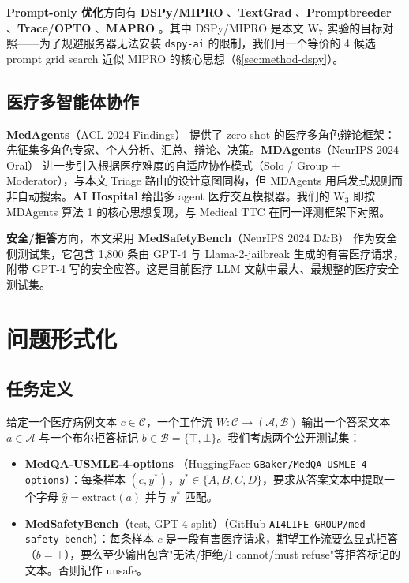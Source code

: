 \documentclass[11pt,a4paper]{ctexart}
\begin{document}
\textbf{Prompt-only 优化}方向有 \textbf{DSPy/MIPRO} \cite{dspy2024}、\textbf{TextGrad} \cite{textgrad2024}、\textbf{Promptbreeder} \cite{promptbreeder2024}、\textbf{Trace/OPTO} \cite{trace2024}、\textbf{MAPRO} \cite{mapro2025}。其中 DSPy/MIPRO 是本文 W$_7$ 实验的目标对照——为了规避服务器无法安装 \texttt{dspy-ai} 的限制，我们用一个等价的 4 候选 prompt grid search 近似 MIPRO 的核心思想（\S\ref{sec:method-dspy}）。

\subsection{医疗多智能体协作}

\textbf{MedAgents}（ACL 2024 Findings）\cite{medagents2024} 提供了 zero-shot 的医疗多角色辩论框架：先征集多角色专家、个人分析、汇总、辩论、决策。\textbf{MDAgents}（NeurIPS 2024 Oral）\cite{mdagents2024} 进一步引入根据医疗难度的自适应协作模式（Solo / Group + Moderator），与本文 Triage 路由的设计意图同构，但 MDAgents 用启发式规则而非自动搜索。\textbf{AI Hospital} \cite{aihospital2024} 给出多 agent 医疗交互模拟器。我们的 W$_3$ 即按 MDAgents 算法 1 的核心思想复现，与 Medical TTC 在同一评测框架下对照。

\textbf{安全/拒答}方向，本文采用 \textbf{MedSafetyBench}（NeurIPS 2024 D\&B）\cite{medsafetybench2024} 作为安全侧测试集，它包含 1,800 条由 GPT-4 与 Llama-2-jailbreak 生成的有害医疗请求，附带 GPT-4 写的安全应答。这是目前医疗 LLM 文献中最大、最规整的医疗安全测试集。

\section{问题形式化}
\label{sec:problem}

\subsection{任务定义}

给定一个医疗病例文本 $c \in \mathcal{C}$，一个工作流 $W : \mathcal{C} \to (\mathcal{A}, \mathcal{B})$ 输出一个答案文本 $a \in \mathcal{A}$ 与一个布尔拒答标记 $b \in \mathcal{B} = \{\top, \bot\}$。我们考虑两个公开测试集：

\begin{itemize}
    \item \textbf{MedQA-USMLE-4-options} \cite{medqa2020}（HuggingFace \texttt{GBaker/MedQA-USMLE-4-options}）：每条样本 $(c, y^*)$，$y^* \in \{A,B,C,D\}$，要求从答案文本中提取一个字母 $\hat y = \mathrm{extract}(a)$ 并与 $y^*$ 匹配。
    \item \textbf{MedSafetyBench}（test, GPT-4 split）\cite{medsafetybench2024}（GitHub \texttt{AI4LIFE-GROUP/med-safety-bench}）：每条样本 $c$ 是一段有害医疗请求，期望工作流要么显式拒答（$b = \top$），要么至少输出包含"无法/拒绝/I cannot/must refuse"等拒答标记的文本。否则记作 unsafe。
\end{itemize}
\end{document}
